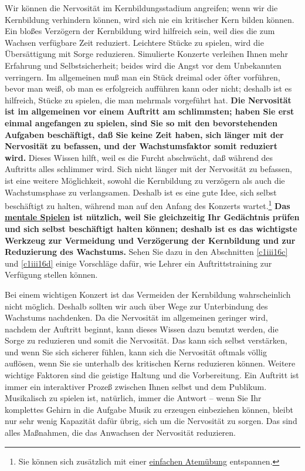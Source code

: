 Wir können die Nervosität im Kernbildungsstadium angreifen; wenn wir die Kernbildung verhindern können, wird sich nie ein kritischer Kern bilden können.
Ein bloßes Verzögern der Kernbildung wird hilfreich sein, weil dies die zum Wachsen verfügbare Zeit reduziert.
Leichtere Stücke zu spielen, wird die Übersättigung mit Sorge reduzieren.
Simulierte Konzerte verleihen Ihnen mehr Erfahrung und Selbstsicherheit; beides wird die Angst vor dem Unbekannten verringern.
Im allgemeinen muß man ein Stück dreimal oder öfter vorführen, bevor man weiß, ob man es erfolgreich aufführen kann oder nicht; deshalb ist es hilfreich, Stücke zu spielen, die man mehrmals vorgeführt hat.
\textbf{Die Nervosität ist im allgemeinen vor einem Auftritt am schlimmsten; haben Sie erst einmal angefangen zu spielen, sind Sie so mit den bevorstehenden Aufgaben beschäftigt, daß Sie keine Zeit haben, sich länger mit der Nervosität zu befassen, und der Wachstumsfaktor somit reduziert wird.}
Dieses Wissen hilft, weil es die Furcht abschwächt, daß während des Auftritts alles schlimmer wird.
Sich nicht länger mit der Nervosität zu befassen, ist eine weitere Möglichkeit, sowohl die Kernbildung zu verzögern als auch die Wachstumsphase zu verlangsamen.
Deshalb ist es eine gute Idee, sich selbst beschäftigt zu halten, während man auf den Anfang des Konzerts wartet.\footnote{Sie können sich zusätzlich mit einer \hyperref[c1ii21uebung]{einfachen Atemübung} entspannen.}
\textbf{Das \hyperref[c1ii12mental]{mentale Spielen} ist nützlich, weil Sie gleichzeitig Ihr Gedächtnis prüfen und sich selbst beschäftigt halten können; deshalb ist es das wichtigste Werkzeug zur Vermeidung und Verzögerung der Kernbildung und zur Reduzierung des Wachstums.}
Sehen Sie dazu in den Abschnitten \hyperref[c1iii16c]{\autoref{c1iii16c}} und \hyperref[c1iii16d]{\autoref{c1iii16d}} einige Vorschläge dafür, wie Lehrer ein Auftrittstraining zur Verfügung stellen können.

Bei einem wichtigen Konzert ist das Vermeiden der Kernbildung wahrscheinlich nicht möglich.
Deshalb sollten wir auch über Wege zur Unterbindung des Wachstums nachdenken.
Da die Nervosität im allgemeinen geringer wird, nachdem der Auftritt beginnt, kann dieses Wissen dazu benutzt werden, die Sorge zu reduzieren und somit die Nervosität.
Das kann sich selbst verstärken, und wenn Sie sich sicherer fühlen, kann sich die Nervosität oftmals völlig auflösen, wenn Sie sie unterhalb des kritischen Kerns reduzieren können.
Weitere wichtige Faktoren sind die geistige Haltung und die Vorbereitung.
Ein Auftritt ist immer ein interaktiver Prozeß zwischen Ihnen selbst und dem Publikum.
Musikalisch zu spielen ist, natürlich, immer die Antwort -- wenn Sie Ihr komplettes Gehirn in die Aufgabe Musik zu erzeugen einbeziehen können, bleibt nur sehr wenig Kapazität dafür übrig, sich um die Nervosität zu sorgen.
Das sind alles Maßnahmen, die das Anwachsen der Nervosität reduzieren.

